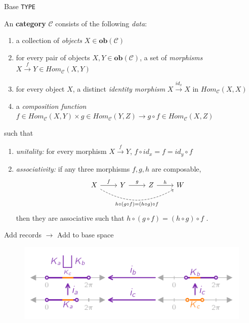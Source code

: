 \documentclass[xcolor={dvipsnames}]{beamer}
\begin{document}
\begin{frame}{Base \texttt{TYPE} \dbasec}
    \begin{definition}\label{def:atct:category}
        An \textbf{category} $\mathcal{C}$ consists of the following \textit{data}:
     \begin{enumerate}
       \item a collection of \textit{objects} $X \in \textbf{ob}(\mathcal{C})$
       \item for every pair of objects $X, Y \in \textbf{ob}(\mathcal{C})$, a set of \textit{morphisms} $X \xrightarrow{f} Y \in Hom_{\mathcal{C}}(X, Y)$
       \item for every object $X$, a distinct \textit{identity morphism} $X \xrightarrow {id_x} X$ in $Hom_{\mathcal{C}}(X, X)$
       \item a \textit{composition function} $f \in Hom_{\mathcal{C}}(X, Y) \times  g \in Hom_{\mathcal{C}}(Y, Z) \rightarrow g \circ f \in Hom_{\mathcal{C}}(X, Z)$
     \end{enumerate}
     such that
     \begin{enumerate}
       \item \textit{unitality:} for every morphism $ X \xrightarrow{f} Y$, $f \circ id_x = f = id_y \circ f$
       \item \textit{associativity:} if any three morphisms $f, g, h$ are composable,
         \begin{equation*}
           \begin{tikzcd}[ampersand replacement=\&]
             X \arrow[r, "f"] \arrow[rrr, "h\circ(g\circ f) = (h\circ g)\circ f"', bend right, dashed] \& Y  \arrow[r, "g"] \& Z \arrow[r, "h"] \& W
             \end{tikzcd}
       \end{equation*}
       then they are associative such that $h\circ(g\circ f) = (h \circ g) \circ f$  \cite{lawvere2009conceptual,riehlCategoryTheoryContext,maclaneCategoriesWorkingMathematician2013,fongInvitationAppliedCategory2019}.
       \end{enumerate}
     \end{definition}
\end{frame}

\begin{frame}{Add records $\rightarrow$ Add to base space}
    \begin{figure}
        \includegraphics[width=\textwidth]{../paper/figures/tex/k_coproduct.pdf}
    \end{figure}
\end{frame}
\end{document}
